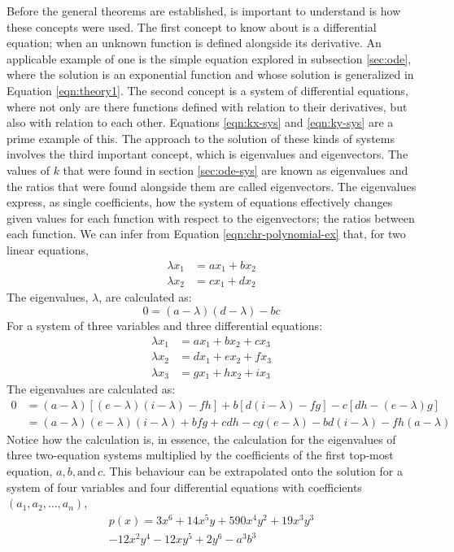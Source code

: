 \documentclass[12pt]{article}
\begin{document}
	Before the general theorems are established, is important to understand is how these concepts were used.
	The first concept to know about is a differential equation; when an unknown function is defined alongside its derivative.
	An applicable example of one is the simple equation explored in subsection \ref{sec:ode}, where the solution is an exponential function and whose solution is generalized in Equation \eqref{eqn:theory1}.
	The second concept is a system of differential equations, where not only are there functions defined with relation to their derivatives, but also with relation to each other.
	Equations \eqref{eqn:kx-sys} and \eqref{eqn:ky-sys} are a prime example of this.
	The approach to the solution of these kinds of systems involves the third important concept, which is eigenvalues and eigenvectors.
	The values of $k$ that were found in section \ref{sec:ode-sys} are known as eigenvalues and the ratios that were found alongside them are called eigenvectors.
	The eigenvalues express, as single coefficients, how the system of equations effectively changes given values for each function with respect to the eigenvectors; the ratios between each function.
	We can infer from Equation \eqref{eqn:chr-polynomial-ex} that, for two linear equations,
	\begin{align*}
		\lambda x_1 &= ax_1 + bx_2 \\
		\lambda x_2 &= cx_1 + dx_2
	\end{align*}
	The eigenvalues, $\lambda$, are calculated as:
	\begin{equation}
		0 = (a - \lambda)(d - \lambda) - bc
	\end{equation}
	For a system of three variables and three differential equations:
	\begin{align*}
		\lambda x_1 &= ax_1 + bx_2 + cx_3 \\
		\lambda x_2 &= dx_1 + ex_2 + fx_3 \\
		\lambda x_3 &= gx_1 + hx_2 + ix_3
	\end{align*}
	The eigenvalues are calculated as:
	\begin{align}
		0 &= (a - \lambda)[(e - \lambda)(i - \lambda) - fh] + b[d(i - \lambda) - fg] - c[dh - (e - \lambda)g] \\
		&= (a - \lambda)(e - \lambda)(i - \lambda) + bfg + cdh - cg(e - \lambda) - bd(i - \lambda) - fh(a - \lambda)
	\end{align}
	Notice how the calculation is, in essence, the calculation for the eigenvalues of three two-equation systems multiplied by the coefficients of the first top-most equation, $a, b, \text{and}\, c$.
	This behaviour can be extrapolated onto the solution for a system of four variables and four differential equations with coefficients $(a_1, a_2, \dots, a_n)$,
	\begin{multline*}
		p(x) = 3x^6 + 14x^5y + 590x^4y^2 + 19x^3y^3\\ 
		- 12x^2y^4 - 12xy^5 + 2y^6 - a^3b^3
	\end{multline*}
	
\end{document}
